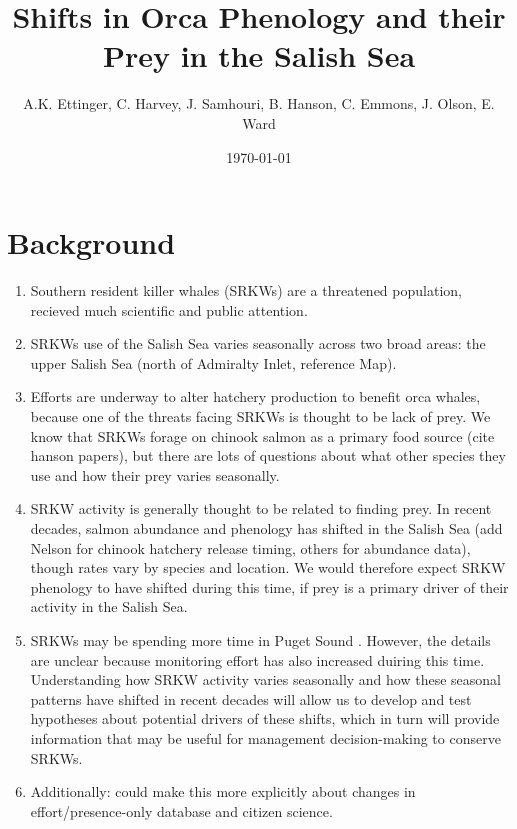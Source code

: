 \documentclass{article}
\begin{document}

\title{Shifts in Orca Phenology and their Prey in the Salish Sea}
\date{\today}
\maketitle
\author{A.K. Ettinger, C. Harvey, J. Samhouri, B. Hanson, C. Emmons, J. Olson, E. Ward}
\maketitle  %

\section* {Background}
\begin{enumerate}
\item Southern resident killer whales (SRKWs) are a threatened population, recieved much scientific and public attention.
\item  SRKWs use of the Salish Sea varies seasonally across two broad areas: the upper Salish Sea 
(north of Admiralty Inlet, reference Map).
\item Efforts are underway to alter hatchery production to benefit orca whales, because one of the threats facing SRKWs is thought to be lack of prey. We know that SRKWs forage on chinook salmon as a primary food source (cite hanson papers), but there are lots of questions about what other species they use and how their prey varies seasonally. 
\item SRKW activity is generally thought to be related to finding prey. In recent decades, salmon abundance and phenology has shifted in the Salish Sea \citep{weinheimer2017,reed2011,ford2006}(add Nelson for chinook hatchery release timing, others for abundance data), though rates vary by species and location. We would therefore expect SRKW phenology to have shifted during this time, if prey is a primary driver of their activity in the Salish Sea. 

\item SRKWs may be spending more time in Puget Sound \citep{olson2018}. However, the details are unclear because monitoring effort has also increased duiring this time. Understanding how SRKW activity varies seasonally and how these seasonal patterns have shifted in recent decades will allow us to develop and test hypotheses about potential drivers of these shifts, which in turn will provide information that may be useful for management decision-making to conserve SRKWs.
\item Additionally: could make this more explicitly about changes in effort/presence-only database and citizen science. 
\end{enumerate}
\end{document}
